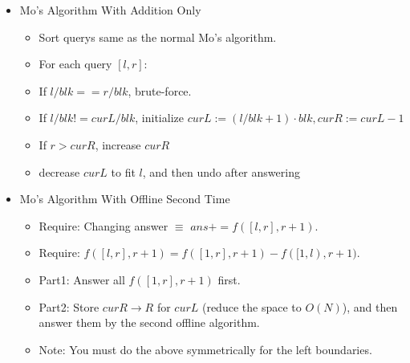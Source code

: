 \begin{itemize}
\item Mo's Algorithm With Addition Only

\begin{itemize}
    \itemsep-0.5em
    \item Sort querys same as the normal Mo's algorithm.
    \item For each query $[l, r]$:
    \item If $l / blk == r / blk$, brute-force.
    \item If $l / blk != curL / blk$, initialize $curL := (l / blk + 1) \cdot blk, curR := curL - 1$
    \item If $r > curR$, increase $curR$
    \item decrease $curL$ to fit $l$, and then undo after answering
\end{itemize}

\item Mo's Algorithm With Offline Second Time

\begin{itemize}
    \itemsep-0.5em
    \item Require: Changing answer $\equiv$ $ans += f([l, r], r + 1)$.
    \item Require: $f([l, r], r + 1) = f([1, r], r + 1) - f([1, l), r + 1)$.
    \item Part1: Answer all $f([1, r], r + 1)$ first.
    \item Part2: Store $curR \to R$ for $curL$ (reduce the space to $O(N)$), and then answer them by the second offline algorithm.
    \item Note: You must do the above symmetrically for the left boundaries.
\end{itemize}
\end{itemize}
